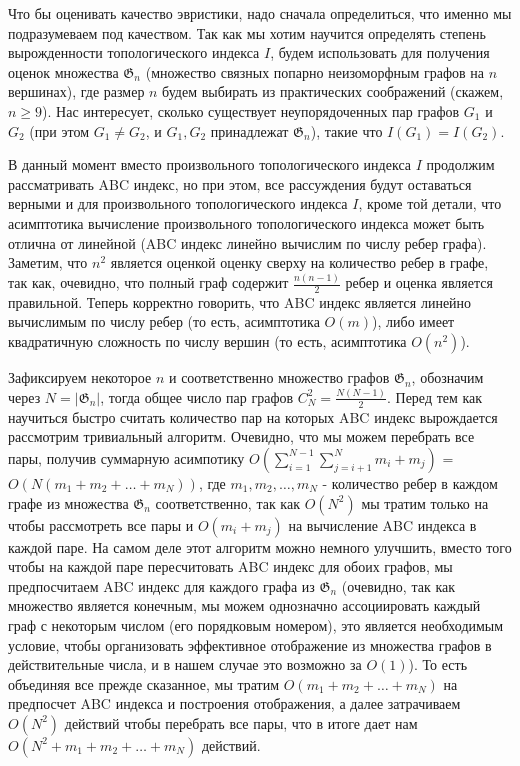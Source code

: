 \documentclass{article}
\begin{document}
Что бы оценивать качество эвристики, надо сначала определиться, что именно мы подразумеваем под качеством. Так как мы хотим научится определять степень вырожденности топологического индекса $I$, будем использовать для получения оценок множества $\mathfrak{G}_n$ (множество связных попарно неизоморфным графов на $n$ вершинах), где размер $n$ будем выбирать из практических соображений (скажем, $n \geq 9$). Нас интересует, сколько существует неупорядоченных пар графов $G_1$ и $G_2$ (при этом $G_1 \neq G_2$, и $G_1, G_2$ принадлежат $\mathfrak{G}_n$), такие что $I(G_1) = I(G_2)$. 

В данный момент вместо произвольного топологического индекса $I$ продолжим рассматривать ABC индекс, но при этом, все рассуждения будут оставаться верными и для произвольного топологического индекса $I$, кроме той детали, что асимптотика вычисление произвольного топологического индекса может быть отлична от линейной (ABC индекс линейно вычислим по числу ребер графа). Заметим, что $n^2$ является оценкой оценку сверху  на количество ребер в графе, так как, очевидно, что полный граф содержит $\frac{n(n-1)}{2}$ ребер и оценка является правильной. Теперь корректно говорить, что ABC индекс является линейно вычислимым по числу ребер (то есть, асимптотика $O(m)$), либо имеет квадратичную сложность по числу вершин (то есть, асимптотика $O(n ^ 2)$). 	 

Зафиксируем некоторое $n$ и соответственно множество графов $\mathfrak{G}_n$, обозначим через $N = |\mathfrak{G}_n|$, тогда общее число пар графов $C_{N}^{2} = \frac{N (N - 1)}{2}$. Перед тем как научиться быстро считать количество пар на которых ABC индекс вырождается рассмотрим тривиальный алгоритм. Очевидно, что мы можем перебрать все пары, получив суммарную асимпотику $O(\sum_{i=1}^{N-1}\sum_{j=i+1}^{N} m_i + m_j)$ = $O(N(m_1 + m_2 + \dots + m_N))$, где $m_1, m_2, \dots, m_{N}$ - количество ребер в каждом графе из множества $\mathfrak{G}_n$ соответственно, так как $O(N^2)$ мы тратим только на чтобы рассмотреть все пары и $O(m_i + m_j)$ на вычисление ABC индекса в каждой паре. На самом деле этот алгоритм можно немного улучшить, вместо того чтобы на каждой паре пересчитовать ABC индекс для обоих графов, мы предпосчитаем ABC индекс для каждого графа из $\mathfrak{G}_n$ (очевидно, так как множество является конечным, мы можем однозначно ассоциировать каждый граф с некоторым числом (его порядковым номером), это является необходимым условие, чтобы организовать эффективное отображение из множества графов в действительные числа, и в нашем случае это возможно за $O(1)$). То есть объединяя все прежде сказанное, мы тратим $O(m_1 + m_2 + \dots + m_N)$ на предпосчет ABC индекса и построения отображения, а далее затрачиваем $O(N^2)$ действий чтобы перебрать все пары, что в итоге дает нам $O(N^2 + m_1 + m_2 + \dots + m_N)$ действий.
\end{document}
